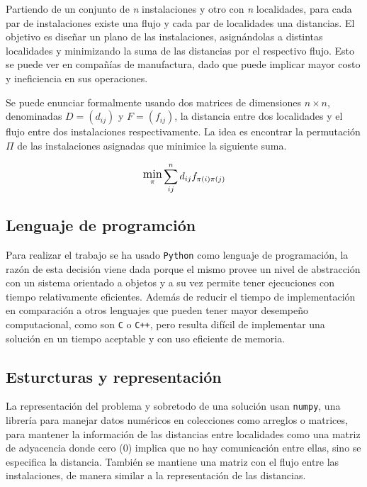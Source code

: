 Partiendo de un conjunto de \textit{n} instalaciones y otro con \textit{n} localidades, para cada par de instalaciones existe una flujo y cada par de localidades una distancias. El objetivo es diseñar un plano de las instalaciones, asignándolas a distintas localidades y minimizando la suma de las distancias por el respectivo flujo. Esto se puede ver en compañías de manufactura, dado que puede implicar mayor costo y ineficiencia en sus operaciones\cite{evo:07:cec}.

Se puede enunciar formalmente usando dos matrices de dimensiones $n\times n$, denominadas $D = (d_{ij})$ y $F = (f_{ij})$, la distancia entre dos localidades y el flujo entre dos instalaciones respectivamente. La idea es encontrar la permutación $\Pi$ de las instalaciones asignadas que minimice la siguiente suma\cite{sm:10:advcomp}.

\[\substack{\text{\large min} \\ \pi}\sum_{ij}^{n} d_{ij}f_{\pi(i)\pi(j)}\]

\subsection*{Lenguaje de programción}

Para realizar el trabajo se ha usado \texttt{Python} como lenguaje de programación, la razón de esta decisión viene dada porque el mismo provee un nivel de abstracción con un sistema orientado a objetos y a su vez permite tener ejecuciones con tiempo relativamente eficientes. Además de reducir el tiempo de implementación en comparación a otros lenguajes que pueden tener mayor desempeño computacional, como son \texttt{C} o \texttt{C++}, pero resulta difícil de implementar una solución en un tiempo aceptable y con uso eficiente de memoria.

\subsection*{Esturcturas y representación}

La representación del problema y sobretodo de una solución usan \texttt{numpy}, una librería para manejar datos numéricos en colecciones como arreglos o matrices, para mantener la información de las distancias entre localidades como una matriz de adyacencia donde cero ($0$) implica que no hay comunicación entre ellas, sino se especifica la distancia. También se mantiene una matriz con el flujo entre las instalaciones, de manera similar a la representación de las distancias.

